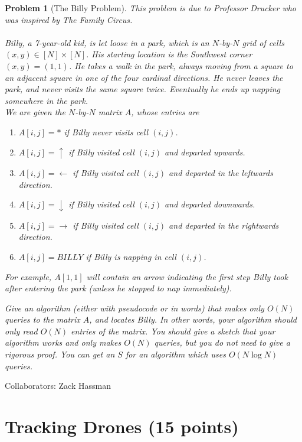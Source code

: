 \documentclass[10pt]{article}
\newcommand{\solution}[1]{
\vspace{2mm}

\noindent Collaborators: Zack Hassman

\vspace{5mm}

\medskip\noindent{\color{cit}\textbf{Solution:} #1}}
\newtheorem{problem}{\sc\color{cit}Problem}
\begin{document}
\iffalse
\begin{problem}[The Billy Problem]
This problem is due to Professor Drucker who was inspired by The Family Circus.\\  
\\
Billy, a 7-year-old kid, is let loose in a park, which is an $N$-by-$N$ grid of cells $(x, y) \in [N]\times [N]$. His starting location is the Southwest corner $(x, y) = (1, 1)$. He takes a walk in the park, always moving from a square to an adjacent square in one of the four cardinal directions.  He never leaves the park, and never visits the same square twice.  Eventually he ends up napping somewhere in the park. \\

We are given the $N$-by-$N$ matrix $A$, whose entries are 
\begin{enumerate}
\item $A[i, j] = *$ if Billy never visits cell $(i, j)$.
\item $A[i, j] = \uparrow$ if Billy visited cell $(i, j)$ and departed upwards.
\item $A[i, j] = \leftarrow$ if Billy visited cell $(i, j)$ and departed in the leftwards direction.
\item $A[i, j] = \downarrow$ if Billy visited cell $(i, j)$ and departed downwards.
\item $A[i, j] = \rightarrow$ if Billy visited cell $(i, j)$ and departed in the rightwards direction.
\item $A[i, j] = BILLY$ if Billy is napping in cell $(i, j)$.
\end{enumerate}

For example, $A[1, 1]$ will contain an arrow indicating the first step Billy took after entering the park (unless he stopped to nap immediately).

Give an algorithm (either with pseudocode or in words) that makes only $O(N)$ queries to the matrix $A$, and locates Billy. In other words, your algorithm should only read $O(N)$ entries of the matrix. You should give a sketch that your algorithm works and only makes $O(N)$ queries, but you do not need to give a rigorous proof. You can get an $S$ for an algorithm which uses $O(N \log N)$ queries.

\end{problem}

\solution{
Your solution here.
}
\section{Tracking Drones (15 points)}
\end{document}

